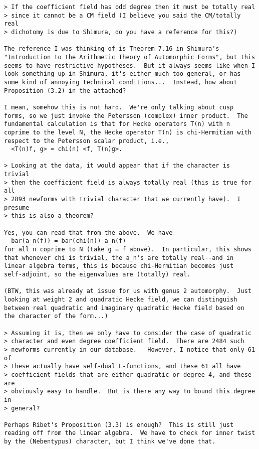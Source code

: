 \documentclass[11pt]{amsart}
\numberwithin{equation}{subsection}
\theoremstyle{plain}
\theoremstyle{definition}
\begin{document}
\begin{verbatim}
> If the coefficient field has odd degree then it must be totally real
> since it cannot be a CM field (I believe you said the CM/totally real
> dichotomy is due to Shimura, do you have a reference for this?)

The reference I was thinking of is Theorem 7.16 in Shimura's
"Introduction to the Arithmetic Theory of Automorphic Forms", but this
seems to have restrictive hypotheses.  But it always seems like when I
look something up in Shimura, it's either much too general, or has
some kind of annoying technical conditions...  Instead, how about
Proposition (3.2) in the attached?

I mean, somehow this is not hard.  We're only talking about cusp
forms, so we just invoke the Petersson (complex) inner product.  The
fundamental calculation is that for Hecke operators T(n) with n
coprime to the level N, the Hecke operator T(n) is chi-Hermitian with
respect to the Petersson scalar product, i.e.,
  <T(n)f, g> = chi(n) <f, T(n)g>.

> Looking at the data, it would appear that if the character is trivial
> then the coefficient field is always totally real (this is true for all
> 2893 newforms with trivial character that we currently have).  I presume
> this is also a theorem?

Yes, you can read that from the above.  We have
  bar(a_n(f)) = bar(chi(n)) a_n(f)
for all n coprime to N (take g = f above).  In particular, this shows
that whenever chi is trivial, the a_n's are totally real--and in
linear algebra terms, this is because chi-Hermitian becomes just
self-adjoint, so the eigenvalues are (totally) real.

(BTW, this was already at issue for us with genus 2 automorphy.  Just
looking at weight 2 and quadratic Hecke field, we can distinguish
between real quadratic and imaginary quadratic Hecke field based on
the character of the form...)

> Assuming it is, then we only have to consider the case of quadratic
> character and even degree coefficient field.  There are 2484 such
> newforms currently in our database.   However, I notice that only 61 of
> these actually have self-dual L-functions, and these 61 all have
> coefficient fields that are either quadratic or degree 4, and these are
> obviously easy to handle.  But is there any way to bound this degree in
> general?

Perhaps Ribet's Proposition (3.3) is enough?  This is still just
reading off from the linear algebra.  We have to check for inner twist
by the (Nebentypus) character, but I think we've done that.
\end{verbatim}
\end{document}
